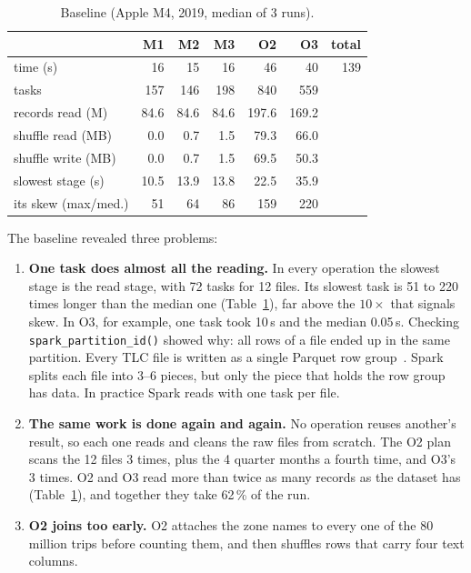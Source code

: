 \documentclass[sigconf]{acmart}
\begin{document}
\begin{table}[h]
\caption{Baseline (Apple M4, 2019, median of 3 runs).}
\label{tab:baseline}
\begin{tabular}{lrrrrrr}
\toprule
 & M1 & M2 & M3 & O2 & O3 & total \\
\midrule
time (s) & 16 & 15 & 16 & 46 & 40 & 139 \\
tasks & 157 & 146 & 198 & 840 & 559 & \\
records read (M) & 84.6 & 84.6 & 84.6 & 197.6 & 169.2 & \\
shuffle read (MB) & 0.0 & 0.7 & 1.5 & 79.3 & 66.0 & \\
shuffle write (MB) & 0.0 & 0.7 & 1.5 & 69.5 & 50.3 & \\
slowest stage (s) & 10.5 & 13.9 & 13.8 & 22.5 & 35.9 & \\
\quad its skew (max/med.) & 51 & 64 & 86 & 159 & 220 & \\
\bottomrule
\end{tabular}
\end{table}

The baseline revealed three problems:
\begin{enumerate}
  \item \textbf{One task does almost all the reading.} In every operation the slowest stage is the read stage, with
    72 tasks for 12 files. Its slowest task is 51 to 220 times longer than the median one (Table~\ref{tab:baseline}),
    far above the $10\times$ that signals skew. In O3, for example, one task took 10\,s and the median 0.05\,s. Checking
    \texttt{spark\_partition\_id()} showed why: all rows of a file ended up in the same partition. Every TLC file is
    written as a single Parquet row group~\cite{parquet}. Spark splits each file into 3--6 pieces, but only the piece
    that holds the row group has data. In practice Spark reads with one task per file.
  \item \textbf{The same work is done again and again.} No operation reuses another's result, so each one reads and
    cleans the raw files from scratch. The O2 plan scans the 12 files 3 times, plus the 4 quarter months a fourth time, and O3's 3 times. O2 and O3 read more than
    twice as many records as the dataset has (Table~\ref{tab:baseline}), and together they take 62\,\% of the run.
  \item \textbf{O2 joins too early.} O2 attaches the zone names to every one of the 80 million trips before
    counting them, and then shuffles rows that carry four text columns.
\end{enumerate}
\end{document}
